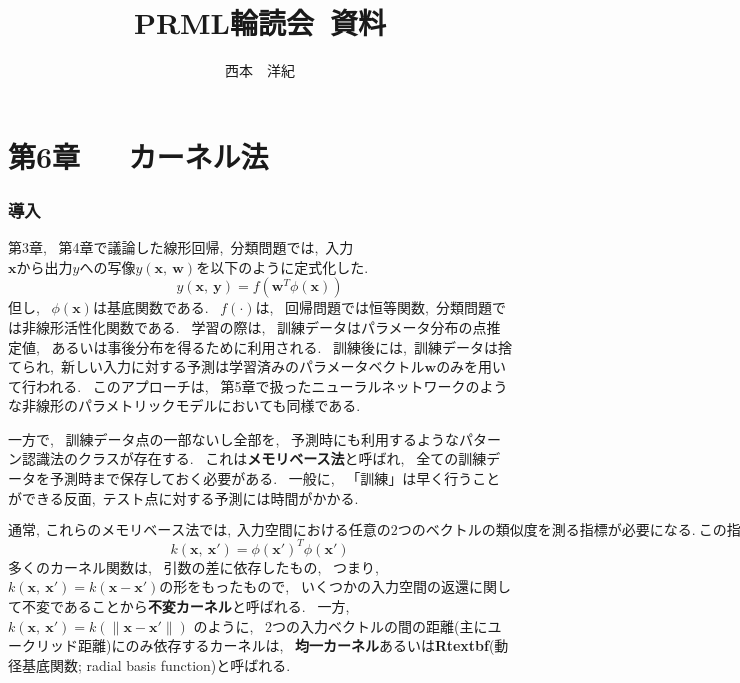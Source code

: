 \documentclass[11pt,a4paper]{jreport}
\begin{document}
\title{PRML輪読会~資料}
\author{西本　洋紀 }
\maketitle
\chapter*{第6章~~~カーネル法}
\subsection*{導入}
第3章,~ 第4章で議論した線形回帰,~分類問題では,~入力$\textbf{x}から出力yへの写像y(\textbf{x},~ \textbf{w})を$以下のように定式化した.~\\
\begin{equation}
  y(\textbf{x},~ \textbf{y}) = f(\textbf{w}^T \phi(\textbf{x}))
\end{equation}
但し,~ $\phi(\textbf{x})$は基底関数である.~ $f(\cdot)$は,~ 回帰問題では恒等関数,~分類問題では非線形活性化関数である.~ 学習の際は,~ 訓練データはパラメータ分布の点推定値,~ あるいは事後分布を得るために利用される.~ 訓練後には,~訓練データは捨てられ,~新しい入力に対する予測は学習済みのパラメータベクトル$\textbf{w}$のみを用いて行われる.~ このアプローチは,~ 第5章で扱ったニューラルネットワークのような非線形のパラメトリックモデルにおいても同様である.~\par
一方で,~ 訓練データ点の一部ないし全部を,~ 予測時にも利用するようなパターン認識法のクラスが存在する.~ これは\textbf{メモリベース法}と呼ばれ,~ 全ての訓練データを予測時まで保存しておく必要がある.~ 一般に,~ 「訓練」は早く行うことができる反面,~テスト点に対する予測には時間がかかる.~ \par
$通常,~ これらのメモリベース法では,~ 入力空間における任意の2つのベクトルの類似度を測る指標が必要になる.~ この指標に\textbf{カーネル関数}を用いる方法を\textbf{カーネル法}といい,~ 本稿で詳しく議論する.~ カーネル関数は,~入力ベクトル\textbf{x}からあらかじめ定義された非線形の特徴空間への写像\phi(\textbf{x})に基づくモデルにおいて,~ 下式(2)のように定義される.~$
\begin{equation}
  k(\textbf{x},~ \textbf{x}') = \phi(\textbf{x}')^T \phi(\textbf{x}')
\end{equation}
多くのカーネル関数は,~ 引数の差に依存したもの,~ つまり,~ $k(\textbf{x},~ \textbf{x}') = k(\textbf{x} - \textbf{x}') $の形をもったもので,~ いくつかの入力空間の返還に関して不変であることから\textbf{不変カーネル}と呼ばれる.~ 一方,~ $k(\textbf{x},~ \textbf{x}') = k(\|\textbf{x} - \textbf{x}'\|)$ のように,~ 2つの入力ベクトルの間の距離(主にユークリッド距離)にのみ依存するカーネルは,~ \textbf{均一カーネル}あるいは\textbf{Rtextbf}(動径基底関数; radial basis function)と呼ばれる.~
\end{document}

